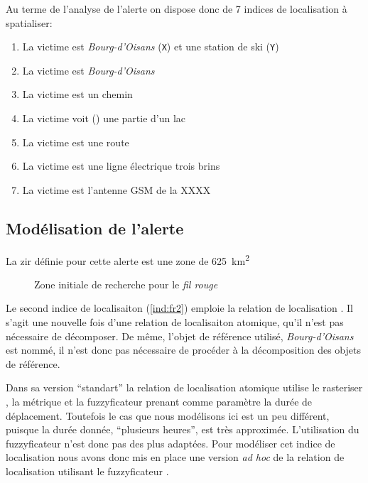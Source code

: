 Au terme de l'analyse de l'alerte on dispose donc de 7 indices de
localisation à spatialiser:
% 
\begin{enumerate}
\item \label{ind:fr1} La victime est
  \emph{Bourg-d'Oisans} (\texttt{X}) et une station de ski
  (\texttt{Y})
\item \label{ind:fr2} La victime est
   \emph{Bourg-d'Oisans} 
\item \label{ind:fr3} La victime est  un
  chemin
\item \label{ind:fr4} La victime voit ()
  une partie d'un lac
\item \label{ind:fr5} La victime est  une
  route
\item \label{ind:fr6} La victime est  une
  ligne électrique trois brins
\item \label{ind:fr7} La victime est 
  l'antenne GSM de la XXXX
\end{enumerate}

\subsection{Modélisation de l'alerte}
\label{subsec:9-4-2}

La \ac{zir} définie pour cette alerte est une zone de
\SI{625}{\kilo\meter\squared}

\begin{figure}
  \centering
  
  \caption{Zone initiale de recherche pour le \emph{fil rouge}}
  \label{fig:zir_fil_rouge}
\end{figure}



Le second indice de localisaiton (\ref{ind:fr2}) emploie la relation
de localisation . Il s'agit une
nouvelle fois d'une relation de localisaiton atomique, qu'il n'est pas
nécessaire de décomposer. De même, l'objet de référence utilisé,
\emph{Bourg-d'Oisans} est nommé, il n'est donc pas nécessaire de
procéder à la décomposition des objets de référence.

Dans sa version \enquote{standart} la relation de localisation
atomique  utilise le rasteriser
, la métrique \onto[orla]{} et la fuzzyficateur
 prenant comme paramètre la durée de
déplacement. Toutefois le cas que nous modélisons ici est un peu
différent, puisque la durée donnée, \enquote{plusieurs heures}, est
très approximée.
%
L'utilisation du fuzzyficateur 
n'est donc pas des plus adaptées.
%
Pour modéliser cet indice de localisation nous avons donc mis en place
une version \emph{ad hoc} de la relation de localisation
 utilisant le fuzzyficateur
.


